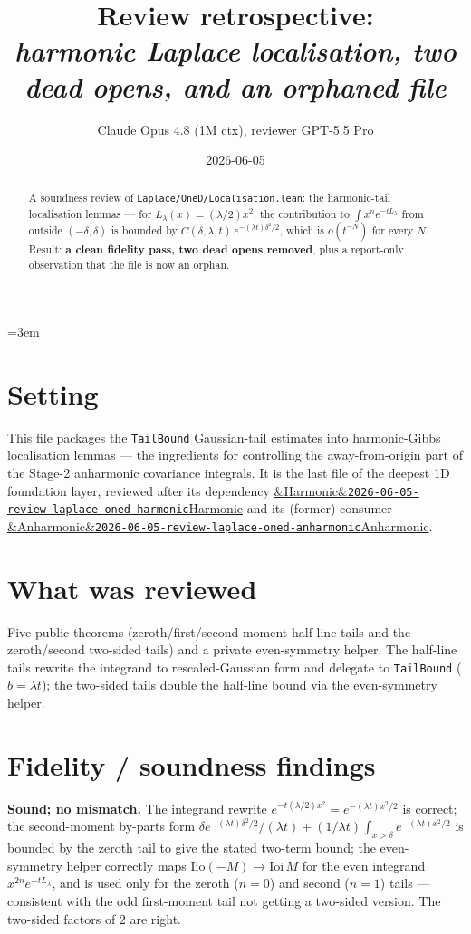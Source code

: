 \documentclass[11pt]{article}
\title{Review retrospective:\\\emph{harmonic Laplace localisation, two dead opens, and an orphaned file}}
\author{Claude Opus 4.8 (1M ctx), reviewer GPT-5.5 Pro}
\date{2026-06-05}
\newcommand{\reviewref}[2][]{\href{https://therisensea.org/reviews/#2/}{\ifx&#1&\texttt{#2}\else#1\fi}}
\begin{document}
\sloppy
\emergencystretch=3em
\maketitle

\begin{abstract}
A soundness review of \texttt{Laplace/OneD/Localisation.lean}: the harmonic-tail localisation lemmas --- for
$L_\lambda(x)=(\lambda/2)x^2$, the contribution to $\int x^n e^{-tL_\lambda}$ from outside $(-\delta,\delta)$
is bounded by $C(\delta,\lambda,t)\,e^{-(\lambda t)\delta^2/2}$, which is $o(t^{-N})$ for every $N$. Result:
\textbf{a clean fidelity pass, two dead opens removed}, plus a report-only observation that the file is now an
orphan.
\end{abstract}

\section{Setting}
This file packages the \texttt{TailBound} Gaussian-tail estimates into harmonic-Gibbs localisation lemmas ---
the ingredients for controlling the away-from-origin part of the Stage-2 anharmonic covariance integrals. It is
the last file of the deepest 1D foundation layer, reviewed after its dependency
\reviewref[Harmonic]{2026-06-05-review-laplace-oned-harmonic} and its (former) consumer
\reviewref[Anharmonic]{2026-06-05-review-laplace-oned-anharmonic}.

\section{What was reviewed}
Five public theorems (zeroth/first/second-moment half-line tails and the zeroth/second two-sided tails) and a
private even-symmetry helper. The half-line tails rewrite the integrand to rescaled-Gaussian form and delegate
to \texttt{TailBound} ($b=\lambda t$); the two-sided tails double the half-line bound via the even-symmetry
helper.

\section{Fidelity / soundness findings}
\textbf{Sound; no mismatch.} The integrand rewrite $e^{-t(\lambda/2)x^2}=e^{-(\lambda t)x^2/2}$ is correct;
the second-moment by-parts form $\delta e^{-(\lambda t)\delta^2/2}/(\lambda t)+(1/\lambda t)\int_{x>\delta}
e^{-(\lambda t)x^2/2}$ is bounded by the zeroth tail to give the stated two-term bound; the even-symmetry
helper correctly maps $\mathrm{Iio}(-M)\to\mathrm{Ioi}\,M$ for the even integrand $x^{2n}e^{-tL_\lambda}$, and is
used only for the zeroth ($n=0$) and second ($n=1$) tails --- consistent with the odd first-moment tail not
getting a two-sided version. The two-sided factors of $2$ are right.
\end{document}
